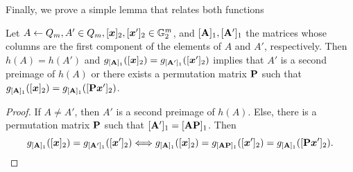 Finally, we prove a simple lemma that relates both functions
\begin{lemma}\label{lemma:hg}
Let $A\gets Q_m,A'\in Q_m,[{\boldsymbol{x}}]_2,[{\boldsymbol{x}}']_2\in\mathbb{G}^m_2$, and $[\mathbf{{A}}]_1,[\mathbf{{A}}']_1$ the matrices whose columns are the first component of the elements of $A$ and $A'$, respectively. Then $h(A)=h(A')$ and $g_{[\mathbf{{A}}]_1}([{\boldsymbol{x}}]_2)=g_{[\mathbf{{A}}']_1}([{\boldsymbol{x}}']_2)$ implies that $A'$ is a second preimage of $h(A)$ or there exists a permutation matrix $\mathbf{{P}}$ such that $g_{[\mathbf{{A}}]_1}([{\boldsymbol{x}}]_2)=g_{[\mathbf{{A}}]_1}([\mathbf{{P}}{\boldsymbol{x}}']_2)$.
\end{lemma}
\begin{proof}
If $A\neq A'$, then $A'$ is a second preimage of $h(A)$. Else, there is a permutation matrix $\mathbf{{P}}$ such that $[\mathbf{{A}}']_1 =[\mathbf{{A}}\mathbf{{P}}]_1$. Then
$$
 g_{[\mathbf{{A}}]_1}([{\boldsymbol{x}}]_2)=g_{[\mathbf{{A}}']_1}([{\boldsymbol{x}}']_2)\Longleftrightarrow  g_{[\mathbf{{A}}]_1}([{\boldsymbol{x}}]_2)=g_{[\mathbf{{A}}\mathbf{{P}}]_1}([{\boldsymbol{x}}']_2)=g_{[\mathbf{{A}}]_1}([\mathbf{{P}}{\boldsymbol{x}}']_2).
$$
\end{proof}
